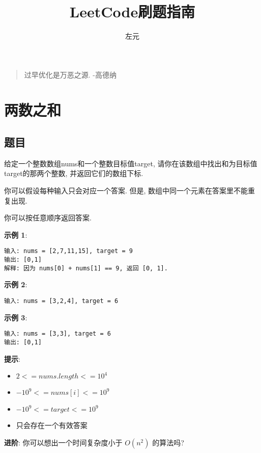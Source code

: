 \documentclass[oneside]{ctexbook}
\title{LeetCode刷题指南}
\author{左元}
\begin{document}
\maketitle
\tableofcontents

\begin{quote}
    过早优化是万恶之源. -高德纳
\end{quote}

\chapter{两数之和}

\section{题目}

给定一个整数数组nums和一个整数目标值target, 请你在该数组中找出和为目标值target的那两个整数, 并返回它们的数组下标.

你可以假设每种输入只会对应一个答案. 但是, 数组中同一个元素在答案里不能重复出现.

你可以按任意顺序返回答案.

\textbf{示例 1}:

\begin{verbatim}
输入: nums = [2,7,11,15], target = 9
输出: [0,1]
解释: 因为 nums[0] + nums[1] == 9, 返回 [0, 1].
\end{verbatim}

\textbf{示例 2}:

\begin{verbatim}
输入: nums = [3,2,4], target = 6
\end{verbatim}

\textbf{示例 3}:

\begin{verbatim}
输入: nums = [3,3], target = 6
输出: [0,1]
\end{verbatim}

\textbf{提示}:

\begin{itemize}
  \item $2 <= nums.length <= 10^4$
  \item $-10^9 <= nums[i] <= 10^9$
  \item $-10^9 <= target <= 10^9$
  \item 只会存在一个有效答案
\end{itemize}

\textbf{进阶}: 你可以想出一个时间复杂度小于 $O(n^2)$ 的算法吗?
\end{document}
